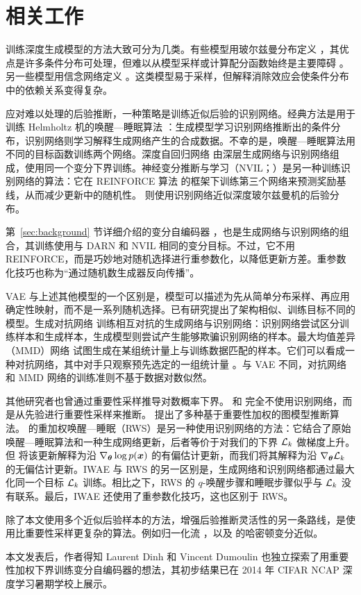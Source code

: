 \section{相关工作}
\label{sec:related-work}

训练深度生成模型的方法大致可分为几类。有些模型用玻尔兹曼分布定义 \citep{rbm,dbm}，其优点是许多条件分布可处理，但难以从模型采样或计算配分函数始终是主要障碍 \citep{ais-rbm}。另一些模型用信念网络定义 \citep{deep-sigmoid,DARN}。这类模型易于采样，但解释消除效应会使条件分布中的依赖关系变得复杂。

应对难以处理的后验推断，一种策略是训练近似后验的识别网络。经典方法是用于训练 Helmholtz 机的唤醒—睡眠算法 \citep{helmholtz_machine}：生成模型学习识别网络推断出的条件分布，识别网络则学习解释生成网络产生的合成数据。不幸的是，唤醒—睡眠算法用不同的目标函数训练两个网络。深度自回归网络 \citep{DARN} 由深层生成网络与识别网络组成，使用同一个变分下界训练。神经变分推断与学习（NVIL；\citealp{nvil}）是另一种训练识别网络的算法：它在 REINFORCE 算法 \citep{reinforce} 的框架下训练第三个网络来预测奖励基线，从而减少更新中的随机性。\citet{dbm-recognition} 则使用识别网络近似深度玻尔兹曼机的后验分布。

第~\ref{sec:background} 节详细介绍的变分自编码器 \citep{vae,vae2}，也是生成网络与识别网络的组合，其训练使用与 DARN 和 NVIL 相同的变分目标。不过，它不用 REINFORCE，而是巧妙地对随机选择进行重参数化，以降低更新方差。重参数化技巧也称为“通过随机数生成器反向传播”\citep{reinforce}。

VAE 与上述其他模型的一个区别是，模型可以描述为先从简单分布采样、再应用确定性映射，而不是一系列随机选择。已有研究提出了架构相似、训练目标不同的模型。生成对抗网络 \citep{generative_adversarial} 训练相互对抗的生成网络与识别网络：识别网络尝试区分训练样本和生成样本，生成模型则尝试产生能够欺骗识别网络的样本。最大均值差异（MMD）网络 \citep{yujia_mmd,karolina_mmd} 试图生成在某组统计量上与训练数据匹配的样本。它们可以看成一种对抗网络，其中对手只观察预先选定的一组统计量 \citep{karolina_mmd}。与 VAE 不同，对抗网络和 MMD 网络的训练准则不基于数据对数似然。

其他研究者也曾通过重要性采样推导对数概率下界。\citet{charlie-stochastic} 和 \citet{jimmy-attention} 完全不使用识别网络，而是从先验进行重要性采样来推断。\citet{dechter-importance} 提出了多种基于重要性加权的图模型推断算法。\cite{RWS} 的重加权唤醒—睡眠（RWS）是另一种使用识别网络的方法：它结合了原始唤醒—睡眠算法和一种生成网络更新，后者等价于对我们的下界 $\mathcal{L}_{k}$ 做梯度上升。但 \citet{RWS} 将该更新解释为沿 $\nabla_{\bm{\theta}}\log p(\bm{x})$ 的有偏估计更新，而我们将其解释为沿 $\nabla_{\bm{\theta}}\mathcal{L}_{k}$ 的无偏估计更新。IWAE 与 RWS 的另一区别是，生成网络和识别网络都通过最大化同一个目标 $\mathcal{L}_{k}$ 训练。相比之下，RWS 的 $q$-唤醒步骤和睡眠步骤似乎与 $\mathcal{L}_{k}$ 没有联系。最后，IWAE 还使用了重参数化技巧，这也区别于 RWS。

除了本文使用多个近似后验样本的方法，增强后验推断灵活性的另一条路线，是使用比重要性采样更复杂的算法。例如归一化流 \citep{normalizing_flows}，以及 \citet{bridging_the_gap} 的哈密顿变分近似。

本文发表后，作者得知 Laurent Dinh 和 Vincent Dumoulin 也独立探索了用重要性加权下界训练变分自编码器的想法，其初步结果已在 2014 年 CIFAR NCAP 深度学习暑期学校上展示。
